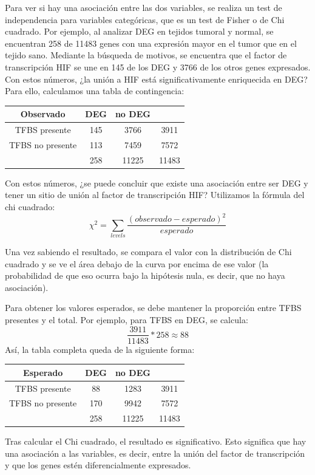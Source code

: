 Para ver si hay una asociación entre las dos variables, se realiza un test de independencia para variables categóricas, que es un test de Fisher o de Chi cuadrado. Por ejemplo, al analizar DEG en tejidos tumoral y normal, se encuentran 258 de 11483 genes con una expresión mayor en el tumor que en el tejido sano. Mediante la búsqueda de motivos, se encuentra que el factor de transcripción HIF se une en 145 de los DEG y 3766 de los otros genes expresados. Con estos números, ¿la unión a HIF está significativamente enriquecida en DEG? Para ello, calculamos una tabla de contingencia:
\begin{table}[htbp]
\centering
\begin{tabular}{c | c c | c}
Observado & DEG & no DEG & \\ \hline
TFBS presente & 145 & 3766 & 3911 \\
TFBS no presente & 113 & 7459 & 7572 \\ \hline
& 258 & 11225 & 11483
\end{tabular}
\end{table}

Con estos números, ¿se puede concluir que existe una asociación entre ser DEG y tener un sitio de unión al factor de transcripción HIF? Utilizamos la fórmula del chi cuadrado:
$$ \chi^2 = \sum_{levels} \frac{(observado-esperado)^2}{esperado}$$

Una vez sabiendo el resultado, se compara el valor con la distribución de Chi cuadrado y se ve el área debajo de la curva por encima de ese valor (la probabilidad de que eso ocurra bajo la hipótesis nula, es decir, que no haya asociación). 

Para obtener los valores esperados, se debe mantener la proporción entre TFBS presentes y el total. Por ejemplo, para TFBS en DEG, se calcula:
$$\frac{3911}{11483} * 258 \approx 88$$
Así, la tabla completa queda de la siguiente forma:
\begin{table}[htbp]
\centering
\begin{tabular}{c | c c | c}
Esperado & DEG & no DEG & \\ \hline
TFBS presente & 88 & 1283 & 3911 \\
TFBS no presente & 170 & 9942 & 7572 \\ \hline
& 258 & 11225 & 11483
\end{tabular}
\end{table}

Tras calcular el Chi cuadrado, el resultado es significativo. Esto significa que hay una asociación a las variables, es decir, entre la unión del factor de transcripción y que los genes estén diferencialmente expresados. 

